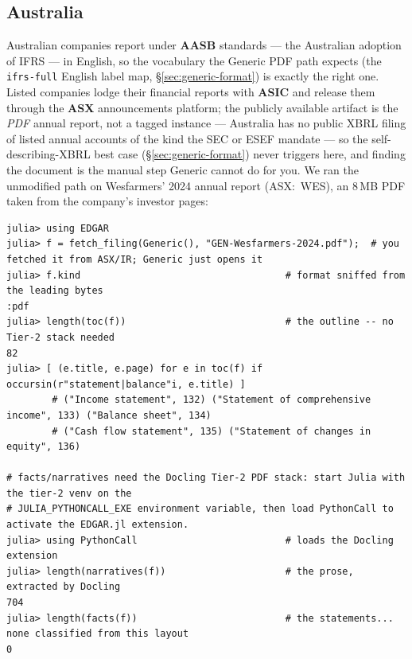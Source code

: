 \documentclass[11pt,a4paper]{report}
\begin{document}
\subsection{Australia}
\label{sec:generic-australia}

Australian companies report under \textbf{AASB} standards --- the Australian adoption of IFRS --- in English,
so the vocabulary the Generic PDF path expects (the \texttt{ifrs-full} English label map,
\S\ref{sec:generic-format}) is exactly the right one. Listed companies lodge their financial reports with
\textbf{ASIC} and release them through the \textbf{ASX} announcements platform; the publicly available artifact
is the \emph{PDF} annual report, not a tagged instance --- Australia has no public XBRL filing of listed annual
accounts of the kind the SEC or ESEF mandate --- so the self-describing-XBRL best case
(\S\ref{sec:generic-format}) never triggers here, and finding the document is the manual step Generic cannot do
for you. We ran the unmodified path on Wesfarmers' 2024 annual report (ASX:~WES), an 8\,MB PDF taken from the
company's investor pages:

\begin{lstlisting}
julia> using EDGAR
julia> f = fetch_filing(Generic(), "GEN-Wesfarmers-2024.pdf");  # you fetched it from ASX/IR; Generic just opens it
julia> f.kind                                    # format sniffed from the leading bytes
:pdf
julia> length(toc(f))                            # the outline -- no Tier-2 stack needed
82
julia> [ (e.title, e.page) for e in toc(f) if occursin(r"statement|balance"i, e.title) ]
        # ("Income statement", 132) ("Statement of comprehensive income", 133) ("Balance sheet", 134)
        # ("Cash flow statement", 135) ("Statement of changes in equity", 136)

# facts/narratives need the Docling Tier-2 PDF stack: start Julia with the tier-2 venv on the
# JULIA_PYTHONCALL_EXE environment variable, then load PythonCall to activate the EDGAR.jl extension.
julia> using PythonCall                          # loads the Docling extension
julia> length(narratives(f))                     # the prose, extracted by Docling
704
julia> length(facts(f))                          # the statements... none classified from this layout
0
\end{lstlisting}
\end{document}

